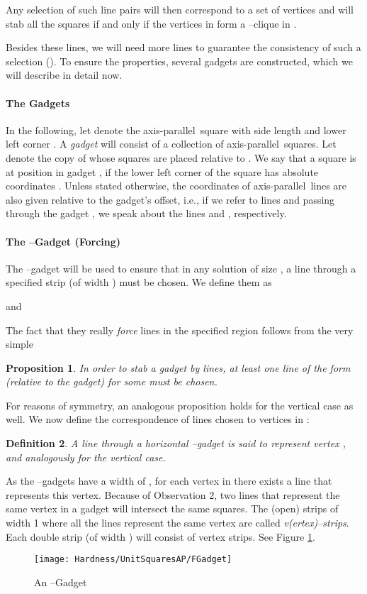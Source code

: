 \documentclass[12pt]{article}
\newtheorem{definition}{Definition}
\newtheorem{proposition}[definition]{Proposition}
\newcommand{\ap}{a.p.\ }
\renewcommand{\ap}{axis-parallel\ }
\begin{document}
Any selection of  such line pairs will then correspond to a set  of  vertices and will stab all the squares if and only if the vertices in  form a --clique in . 

Besides these  lines, we will need  more lines to guarantee the consistency of such a selection (). To ensure the properties, several gadgets are constructed, which we will describe in detail now.

\paragraph{The Gadgets} In the following, let  denote the \ap square with side length  and lower left corner . A \textit{gadget}  will consist of a collection of \ap squares. Let  denote the copy of  whose squares are placed relative to . We say that a square is at position  in gadget , if the lower left corner of the square has absolute coordinates . Unless stated otherwise, the coordinates of \ap lines are also given relative to the gadget's offset, i.e., if we refer to lines  and  passing through the gadget , we speak about the lines  and , respectively.

\paragraph{The --Gadget (Forcing)}
The --gadget will be used to ensure that in any solution of size , a line through a specified strip (of width ) must be chosen. We define them as

and 

The fact that they really \textit{force} lines in the specified region follows from the very simple
\begin{proposition}\label{Lemma:Forcing} In order to stab a gadget  by  lines, at least one line of the form  (relative to the gadget) for some  must be chosen.
\end{proposition}
For reasons of symmetry, an analogous proposition holds for the vertical case as well.
We now define the correspondence of lines chosen to vertices in :
\begin{definition} A line  through a horizontal --gadget is said to \textit{represent} vertex , and analogously for the vertical case.
\end{definition}
As the --gadgets have a width of , for each vertex in  there exists a line that represents this vertex. Because of Observation 2, two lines that represent the same vertex in a gadget  will intersect the same squares. The (open) strips of width 1 where all the lines represent the same vertex are called \textit{v(ertex)--strips}. Each double strip (of width ) will consist of  vertex strips. See Figure \ref{fig:FGadget}.
\begin{figure}
	\centering
		\texttt{[image: Hardness/UnitSquaresAP/FGadget]}
	\caption{An --Gadget}
	\label{fig:FGadget}
\end{figure}
\end{document}

